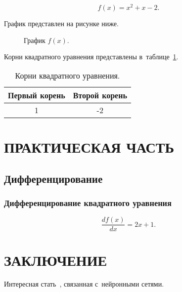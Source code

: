 \documentclass[rusmathsym, eqnumwithinsec, amspack, hyperref]{bomgost}
\begin{document}
\begin{equation}
f(x) = x^2 + x-2.
\end{equation}

График представлен на рисунке ниже.
\begin{gostfigure}
\begin{figure}[H]
\centering
{}
\caption{График \(f(x)\).}
\end{figure}
\end{gostfigure}

Корни квадратного уравнения представлены в~таблице~\ref{tab:roots}.
\begin{gosttable}
\begin{table}[H]
\centering
\caption{Корни квадратного уравнения.}
\label{tab:roots}
\begin{tabular}{|c|c|}
\hline 
Первый корень &  Второй корень \\ 
\hline 
1 & -2  \\ 
\hline 
\end{tabular}
\end{table}
\end{gosttable}



\section{ПРАКТИЧЕСКАЯ ЧАСТЬ}
\subsection{Дифференцирование}
\subsubsection{Дифференцирование квадратного уравнения}
\begin{equation}
\dfrac{d f(x)}{d x} = 2 x + 1.
\end{equation}

\section*{ЗАКЛЮЧЕНИЕ}
Интересная стать~\cite{Cybenko}, связанная с~нейронными сетями.
\end{document}
